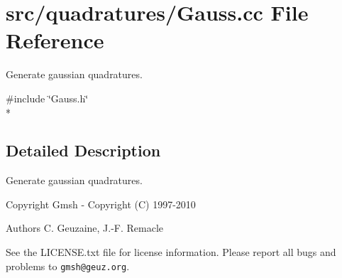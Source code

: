 \section{src/quadratures/\-Gauss.cc File Reference}
\label{Gauss_8cc}


Generate gaussian quadratures.  


{\ttfamily \#include \char`\"{}Gauss.\-h\char`\"{}}\\*


\subsection{Detailed Description}
Generate gaussian quadratures. \begin{DoxyCopyright}{Copyright}
Gmsh -\/ Copyright (C) 1997-\/2010 
\end{DoxyCopyright}
\begin{DoxyAuthor}{Authors}
C. Geuzaine, J.-\/\-F. Remacle
\end{DoxyAuthor}
See the L\-I\-C\-E\-N\-S\-E.\-txt file for license information. Please report all bugs and problems to {\tt gmsh@geuz.\-org}. 